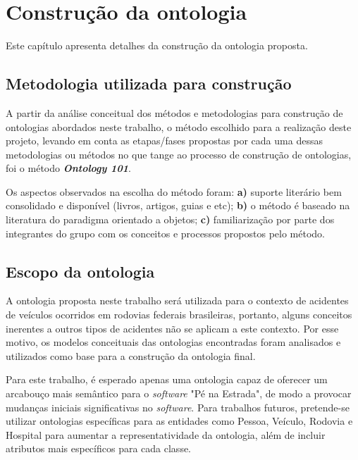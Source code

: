 \chapter{Construção da ontologia}
  
  Este capítulo apresenta detalhes da construção da ontologia proposta.

  \section{Metodologia utilizada para construção}
    
      A partir da análise conceitual dos métodos e metodologias para construção de ontologias abordados neste trabalho, 
      o método escolhido para a realização deste projeto, levando em conta as etapas/fases propostas por cada uma dessas 
      metodologias ou métodos no que tange ao processo de construção de ontologias, foi o método \textit{\textbf{Ontology 101}}.
  
      Os aspectos observados na escolha do método foram: \textbf{a)} suporte literário bem consolidado e disponível 
      (livros, artigos, guias e etc); \textbf{b)} o método é baseado na literatura do paradigma orientado a objetos;
      \textbf{c)} familiarização por parte dos integrantes do grupo com os conceitos e processos propostos pelo método.
    
  \section{Escopo da ontologia}
      
      A ontologia proposta neste trabalho será utilizada para o contexto de acidentes de veículos ocorridos em rodovias
      federais brasileiras, portanto, alguns conceitos inerentes a outros tipos de acidentes não se aplicam a este 
      contexto. Por esse motivo, os modelos conceituais das ontologias encontradas foram analisados e utilizados como base 
      para a construção da ontologia final.
      
      Para este trabalho, é esperado apenas uma ontologia capaz de oferecer um arcabouço mais semântico para o \textit{software} 
      "Pé na Estrada", de modo a provocar mudanças iniciais significativas no \textit{software}.
      Para trabalhos futuros, pretende-se utilizar ontologias específicas para as entidades como Pessoa, Veículo, Rodovia e
      Hospital para aumentar a representatividade da ontologia, 
      além de incluir atributos mais específicos para cada classe.
  
